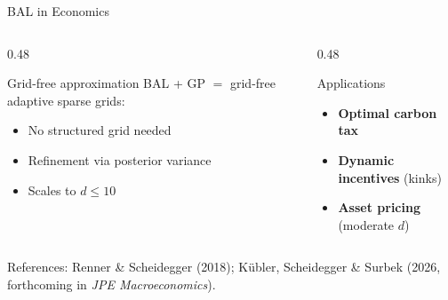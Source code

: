 \documentclass[aspectratio=169,11pt]{beamer}
\begin{document}
\begin{frame}{BAL in Economics}
\begin{columns}[T]
\begin{column}{0.48\textwidth}
\begin{block}{Grid-free approximation}
BAL + GP $=$ grid-free adaptive sparse grids:
\begin{itemize}\setlength{\itemsep}{1pt}
  \item No structured grid needed
  \item Refinement via posterior variance
  \item Scales to $d \leq 10$
\end{itemize}
\end{block}
\end{column}
\begin{column}{0.48\textwidth}
\begin{block}{Applications}
\begin{itemize}\setlength{\itemsep}{1pt}
  \item \textbf{Optimal carbon tax}
  \item \textbf{Dynamic incentives} (kinks)
  \item \textbf{Asset pricing} (moderate $d$)
\end{itemize}
\end{block}
\end{column}
\end{columns}

\vspace{0.3cm}
{\small References: Renner \& Scheidegger (2018); K\"ubler, Scheidegger \& Surbek (2026, forthcoming in \emph{JPE Macroeconomics}).}
\end{frame}
\end{document}
